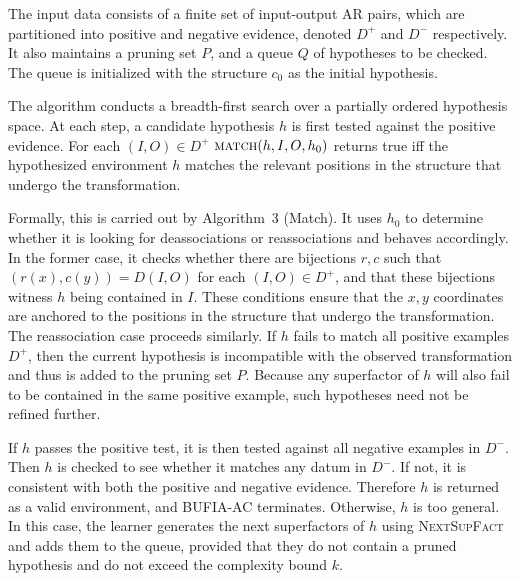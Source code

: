 The input data consists of a finite set of input-output AR pairs, which
are partitioned into positive and negative evidence, denoted $D^+$ and
$D^-$ respectively. It also maintains a pruning set \(P\), and a queue
\(Q\) of hypotheses to be checked. The queue is initialized with the
structure \(c_0\) as the initial hypothesis.

The algorithm conducts a breadth-first search over a partially ordered
hypothesis space. At each step, a candidate hypothesis $h$ is first
tested against the positive evidence. For each \((I,O)\in D^+\)
$\textsc{match}(h, I, O,h_0)$ returns true iff the hypothesized
environment \(h\) matches the relevant positions in the structure that
undergo the transformation.

Formally, this is carried out by Algorithm~3 (Match). It uses \(h_0\) to
determine whether it is looking for deassociations or reassociations and
behaves accordingly. In the former case, it checks whether there are
bijections \(r,c\) such that \((r(x),c(y))=D(I,O)\) for each \((I,O)\in
D^+\), and that these bijections witness \(h\) being contained in \(I\).
These conditions ensure that the \(x,y\) coordinates are anchored to the
positions in the structure that undergo the transformation. The
reassociation case proceeds similarly. If \(h\) fails to match all
positive examples \(D^+\), then the current hypothesis is incompatible
with the observed transformation and thus is added to the pruning set
$P$. Because any superfactor of \(h\) will also fail to be contained in
the same positive example, such hypotheses need not be refined further.

If \(h\) passes the positive test, it is then tested against all
negative examples in $D^-$. Then \(h\) is checked to see whether it
matches any datum in $D^-$. If not, it is consistent with both the
positive and negative evidence. Therefore \(h\) is returned as a valid
environment, and BUFIA-AC terminates. Otherwise, \(h\) is too general.
In this case, the learner generates the next superfactors of \(h\) using
\textsc{NextSupFact} and adds them to the queue, provided that they do
not contain a pruned hypothesis and do not exceed the complexity bound
\(k\).

